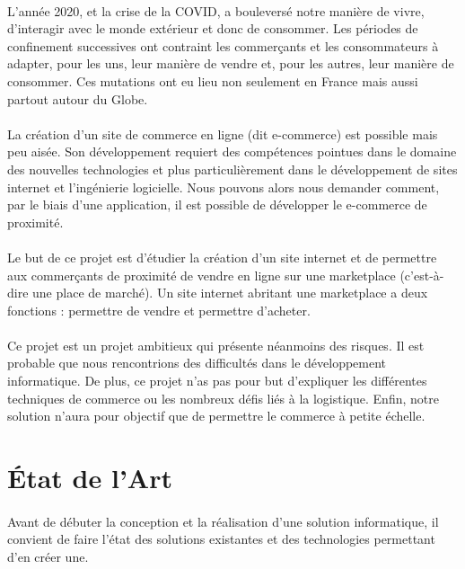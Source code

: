 \documentclass[a4paper, 12pt]{article}
\begin{document}
\paragraph{}L’année 2020, et la crise de la COVID, a bouleversé notre manière de vivre, d'interagir avec le monde extérieur et donc de consommer. Les périodes de confinement successives ont contraint les commerçants et les consommateurs à adapter, pour les uns, leur manière de vendre et, pour les autres, leur manière de consommer. Ces mutations ont eu lieu non seulement en France mais aussi partout autour du Globe.
\paragraph{}La création d’un site de commerce en ligne (dit e-commerce) est possible mais peu aisée. Son développement requiert des compétences pointues dans le domaine des nouvelles technologies et plus particulièrement dans le développement de sites internet et l'ingénierie logicielle. Nous pouvons alors nous demander comment, par le biais d’une application, il est possible de développer le e-commerce de proximité.
\paragraph{}Le but de ce projet est d’étudier la création d’un site internet et de permettre aux commerçants de proximité de vendre en ligne sur une marketplace (c’est-à-dire une place de marché). Un site internet abritant une marketplace a deux fonctions : permettre de vendre et permettre d’acheter.
\paragraph{}Ce projet est un projet ambitieux qui présente néanmoins des risques. Il est probable que nous rencontrions des difficultés dans le développement informatique. De plus, ce projet n’as pas pour but d’expliquer les différentes techniques de commerce ou les nombreux défis liés à la logistique. Enfin, notre solution n’aura pour objectif que de permettre le commerce à petite échelle.

\newpage
\section{État de l'Art}
\paragraph{}Avant de débuter la conception et la réalisation d'une solution informatique, il convient de faire l'état des solutions existantes et des technologies permettant d'en créer une.
\end{document}

